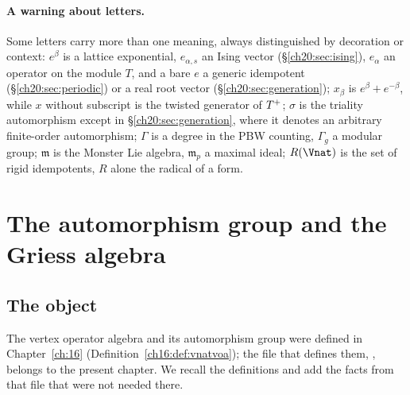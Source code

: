 \paragraph{A warning about letters.}  Some letters carry more than one meaning, always distinguished by decoration or
context: $e^\beta$ is a lattice exponential, $e_{\alpha,s}$ an Ising vector (\S\ref{ch20:sec:ising}), $e_\alpha$ an operator on
the module $T$, and a bare $e$ a generic idempotent (\S\ref{ch20:sec:periodic}) or a real root vector
(\S\ref{ch20:sec:generation}); $x_\beta$ is $e^\beta+e^{-\beta}$, while $x$ without subscript is the twisted generator of
$T^{+}$; $\sigma$ is the triality automorphism except in \S\ref{ch20:sec:generation}, where it denotes an arbitrary
finite-order automorphism; $\Gamma$ is a degree in the PBW counting, $\Gamma_g$ a modular group; $\mathfrak m$ is the Monster
Lie algebra, $\mathfrak m_p$ a maximal ideal; $R(\Vnat)$ is the set of rigid idempotents, $R$ alone the radical of a form.

\section{The automorphism group and the Griess algebra}\label{ch20:sec:aut}

\subsection{The object}

The vertex operator algebra  and its automorphism group  were defined in
Chapter~\ref{ch:16} (Definition~\ref{ch16:def:vnatvoa}); the file that defines them,
, belongs to the present chapter.  We recall the definitions and add the facts
from that file that were not needed there.

